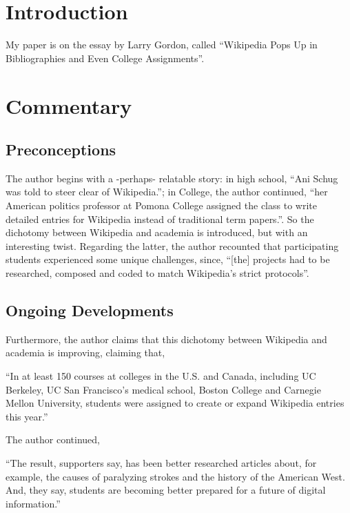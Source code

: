 \section{Introduction}

My paper is on the essay by Larry Gordon, called ``Wikipedia Pops Up in Bibliographies and Even College Assignments''.



\section{Commentary}



\subsection{Preconceptions}

The author begins with a -perhaps- relatable story: in high school, ``Ani Schug was told to steer clear of Wikipedia.''; in College, the author continued, ``her American politics professor at Pomona College assigned the class to write detailed entries for Wikipedia instead of traditional term papers.''. So the dichotomy between Wikipedia and academia is introduced, but with an interesting twist. Regarding the latter, the author recounted that participating students experienced some unique challenges, since, ``[the] projects had to be researched, composed and coded to match Wikipedia’s strict protocols''.



\subsection{Ongoing Developments}

Furthermore, the author claims that this dichotomy between Wikipedia and academia is improving, claiming that,

``In at least 150 courses at colleges in the U.S. and Canada, including UC Berkeley, UC San Francisco’s medical school, Boston College and Carnegie Mellon University, students were assigned to create or expand Wikipedia entries this year.''

The author continued,

``The result, supporters say, has been better researched articles about, for example, the causes of paralyzing strokes and the history of the American West. And, they say, students are becoming better prepared for a future of digital information.''


